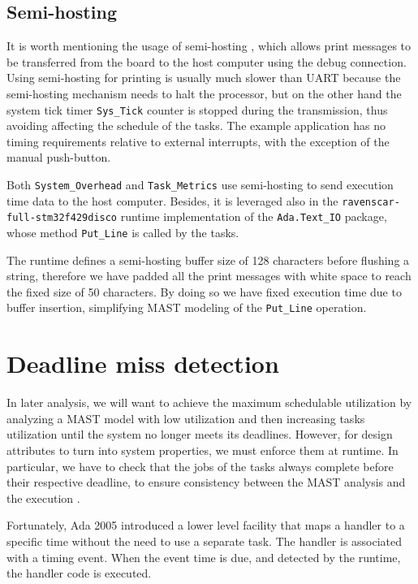 \documentclass{article}
\begin{document}
\subsection{Semi-hosting}

It is worth mentioning the usage of semi-hosting \cite{semihosting}, which allows print messages to be transferred from the board to the host computer using the debug connection. Using semi-hosting for printing is usually much slower than UART because the semi-hosting mechanism needs to halt the processor, but on the other hand the system tick timer \texttt{Sys\_Tick} counter is stopped during the transmission, thus avoiding affecting the schedule of the tasks. The example application has no timing requirements relative to external interrupts, with the exception of the manual push-button.

Both \texttt{System\_Overhead} and \texttt{Task\_Metrics} use semi-hosting to send execution time data to the host computer. Besides, it is leveraged also in the \texttt{ravenscar-full-stm32f429disco} runtime implementation of the \texttt{Ada.Text\_IO} package, whose method \texttt{Put\_Line} is called by the tasks.

The runtime defines a semi-hosting buffer size of 128 characters before flushing a string, therefore we have padded all the print messages with white space to reach the fixed size of 50 characters. By doing so we have fixed execution time due to buffer insertion, simplifying MAST modeling of the \texttt{Put\_Line} operation.

\section{Deadline miss detection}

In later analysis, we will want to achieve the maximum schedulable utilization by analyzing a MAST model with low utilization and then increasing tasks utilization until the system no longer meets its deadlines. However, for design attributes to turn into system properties, we must enforce them at runtime. In particular, we have to check that the jobs of the tasks always complete before their respective deadline, to ensure consistency between the MAST analysis and the execution \cite{timing-properties}.

Fortunately, Ada 2005 introduced a lower level facility that maps a handler to a specific time without the need to use a separate task. The handler is associated with a timing event. When the event time is due, and detected by the runtime, the handler code is executed.
\end{document}
